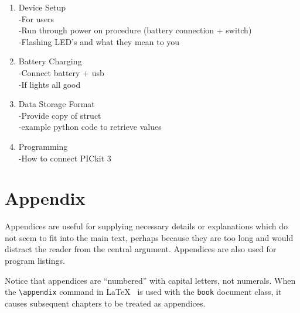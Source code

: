 \documentclass[12pt,openany,a4paper]{book}
\begin{document}
\begin{enumerate}
	\item Device Setup\\
		-For users\\
		-Run through power on procedure (battery connection + switch)\\
		-Flashing LED's and what they mean to you \\
	\item Battery Charging\\
		-Connect battery + usb \\
		-If lights all good \\
	\item Data Storage Format \\
		-Provide copy of struct \\
		-example python code to retrieve values\\
	\item Programming \\
		-How to connect PICkit 3
		
\end{enumerate}


\appendix


\newpage
{}
\mbox{}
\newpage



\chapter{Appendix}

Appendices are useful for supplying necessary details or explanations
which do not seem to fit into the main text, perhaps because they are
too long and would distract the reader from the central argument.
Appendices are also used for program listings.

Notice that appendices are ``numbered'' with capital letters, not
numerals.  When the \verb+\appendix+ command in
\LaTeX~\cite[p.\,175]{lamport} is used with the \texttt{book} document
class, it causes subsequent chapters to be treated as appendices.
\end{document}
